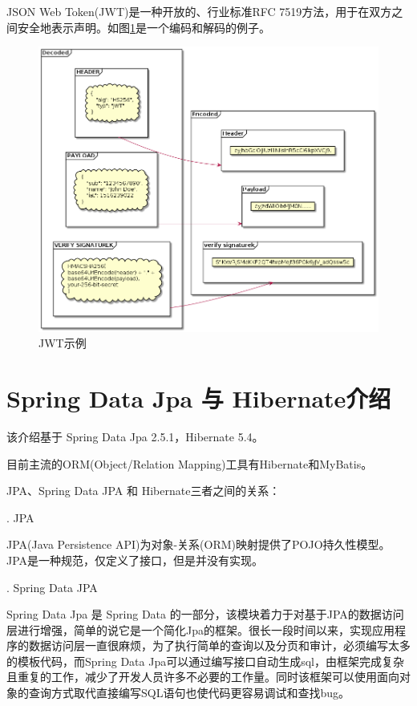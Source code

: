 JSON Web Token(JWT)是一种开放的、行业标准RFC 7519方法，用于在双方之间安全地表示声明。如图\ref{jwt}是一个编码和解码的例子。
\begin{figure}[htbp]
  \centering
  \includegraphics[scale = 0.5]{out/uml/部署图/JWT/JWT.png}
  \caption{\song\wuhao JWT示例}
  \label{jwt}
\end{figure}

\section{Spring Data Jpa 与 Hibernate介绍}

该介绍基于 Spring Data Jpa 2.5.1，Hibernate 5.4。

目前主流的ORM(Object/Relation Mapping)工具有Hibernate和MyBatis。

JPA、Spring Data JPA 和 Hibernate三者之间的关系：

. JPA

JPA(Java Persistence API)为对象-关系(ORM)映射提供了POJO持久性模型。JPA是一种规范，仅定义了接口，但是并没有实现。

. Spring Data JPA

Spring Data Jpa 是 Spring Data 的一部分，该模块着力于对基于JPA的数据访问层进行增强，简单的说它是一个简化Jpa的框架。很长一段时间以来，实现应用程序的数据访问层一直很麻烦，为了执行简单的查询以及分页和审计，必须编写太多的模板代码，而Spring Data Jpa可以通过编写接口自动生成sql，由框架完成复杂且重复的工作，减少了开发人员许多不必要的工作量。同时该框架可以使用面向对象的查询方式取代直接编写SQL语句也使代码更容易调试和查找bug。

